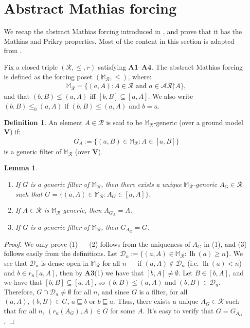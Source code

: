 \documentclass[10pt,a4paper]{amsart}
\theoremstyle{plain}
\numberwithin{equation}{section}
\newtheorem{lemma}[theorem]{Lemma}
\theoremstyle{definition}
\newtheorem{definition}[theorem]{Definition}
\newcommand{\func}{\operatorname}
\newcommand{\cal}{\mathcal}
\renewcommand{\bf}{\mathbf}
\newcommand{\restrictedto}{\mathord{\upharpoonright}}
\newcommand{\V}{\bf{V}}
\newcommand{\lh}{\func{lh}}
\newcommand{\D}{\cal{D}}
\DeclareRobustCommand{\S}{\ifmmode\mathcal{S}\else\Sec\fi}
\begin{document}
\section{Abstract Mathias forcing}
\label{sec:abstract.Mathias.forcing}
We recap the abstract Mathias forcing introduced in \cite{DMN15}, and prove that it has the Mathias and Prikry properties. Most of the content in this section is adapted from \cite[\S6]{Y25}.

Fix a closed triple $(\cal{R},\leq,r)$ satisfying \textbf{A1}--\textbf{A4}. The abstract Mathias forcing is defined as the forcing poset $(\mathbb{M}_\cal{R},\leq)$, where:
\begin{align*}
    \mathbb{M}_\cal{R} = \{(a,A) : A \in \cal{R} \text{ and } a \in \cal{AR}\restrictedto A\},
\end{align*}
and that $(b,B) \leq (a,A)$ iff $[b,B] \subseteq [a,A]$. We also write $(b,B) \leq_0 (a,A)$ if $(b,B) \leq (a,A)$ and $b = a$.

\begin{definition}
    An element $A \in \cal{R}$ is said to be $\mathbb{M}_\cal{R}$-generic (over a ground model $\V$) if:
    \begin{align*}
        G_A := \{(a,B) \in \mathbb{M}_\cal{R} : A \in [a,B]\}
    \end{align*}
    is a generic filter of $\mathbb{M}_\cal{R}$ (over $\V$).
\end{definition}

\begin{lemma}
\label{lem:generic.filter.and.element}
\hfill
    \begin{enumerate}
        \item If $G$ is a generic filter of $\mathbb{M}_\cal{R}$, then there exists a unique $\mathbb{M}_\cal{R}$-generic $A_G \in \cal{R}$ such that $G = \{(a,A) \in \mathbb{M}_\cal{R} : A_G \in [a,A]\}$.

        \item If $A \in \cal{R}$ is $\mathbb{M}_\cal{R}$-generic, then $A_{G_A} = A$.

        \item If $G$ is a generic filter of $\mathbb{M}_\cal{R}$, then $G_{A_G} = G$.
    \end{enumerate}
\end{lemma}

\begin{proof}
    We only prove (1) --- (2) follows from the uniqueness of $A_G$ in (1), and (3) follows easily from the definitions. Let $\D_n := \{(a,A) \in \mathbb{M}_\cal{R} : \lh(a) \geq n\}$. We see that $\D_n$ is dense open in $\mathbb{M}_\cal{R}$ for all $n$ --- if $(a,A) \notin \D_n$ (i.e. $\lh(a) < n$) and $b \in r_n[a,A]$, then by \textbf{A3}(1) we have that $[b,A] \neq \emptyset$. Let $B \in [b,A]$, and we have that $[b,B] \subseteq [a,A]$, so $(b,B) \leq (a,A)$ and $(b,B) \in \D_n$. Therefore, $G \cap \D_n \neq \emptyset$ for all $n$, and since $G$ is a filter, for all $(a,A),(b,B) \in G$, $a \sqsubseteq b$ or $b \sqsubseteq a$. Thus, there exists a unique $A_G \in \cal{R}$ such that for all $n$, $(r_n(A_G),A) \in G$ for some $A$. It's easy to verify that $G = G_{A_G}$.
\end{proof} 
\end{document}
